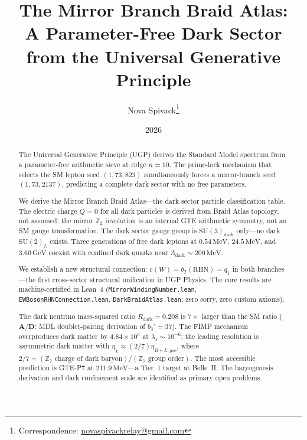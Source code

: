 \documentclass[11pt]{article}
\title{\bfseries The Mirror Branch Braid Atlas:\\[0.3em]
A Parameter-Free Dark Sector\\[0.3em]
from the Universal Generative Principle}
\author[1]{Nova Spivack\thanks{Correspondence:
  \href{mailto:novaspivackrelay@gmail.com}{novaspivackrelay@gmail.com}}}
\affil[1]{Independent Research}
\date{2026}
\newcommand{\CatAD}{\textbf{A/D}}
\begin{document}
\maketitle
\NovaZenodoAfterTitle

\begin{abstract}
The Universal Generative Principle (UGP) derives the Standard Model spectrum from a
parameter-free arithmetic sieve at ridge $n=10$. The prime-lock mechanism that selects
the SM lepton seed $(1,73,823)$ simultaneously forces a mirror-branch seed $(1,73,2137)$,
predicting a complete dark sector with no free parameters.

We derive the Mirror Branch Braid Atlas---the dark sector particle classification table.
The electric charge $Q=0$ for all dark particles is derived from Braid Atlas topology,
not assumed: the mirror $\mathbb{Z}_2$ involution is an internal GTE arithmetic symmetry,
not an SM gauge transformation. The dark sector gauge group is $\mathrm{SU}(3)_\mathrm{dark}$
only---no dark $\mathrm{SU}(2)_L$ exists. Three generations of free dark leptons at
$0.54\,\mathrm{MeV}$, $24.5\,\mathrm{MeV}$, and $3.60\,\mathrm{GeV}$ coexist with
confined dark quarks near $\Lambda_\mathrm{dark}\sim 200\,\mathrm{MeV}$.

We establish a new structural connection: $c(W) = b_2(\mathrm{RHN}) = q_1$ in both
branches---the first cross-sector structural unification in UGP Physics. The core results
are machine-certified in Lean~4 (\texttt{MirrorWindingNumber.lean},
\texttt{EWBosonRHNConnection.lean}, \texttt{DarkBraidAtlas.lean}; zero sorry, zero
custom axioms).

The dark neutrino mass-squared ratio $R_\mathrm{dark} = 0.208$ is $7\times$ larger than
the SM ratio ($\CatAD$: MDL doublet-pairing derivation of $b_3'=37$). The FIMP mechanism overproduces
dark matter by $4.84\times10^6$ at $\lambda_s \sim 10^{-6}$; the leading resolution is
asymmetric dark matter with $\eta_\chi \approx (2/7)\eta_{B+L,\mathrm{pre}}$, where
$2/7 = (\mathbb{Z}_7\text{ charge of dark baryon})/(\mathbb{Z}_7\text{ group order})$.
The most accessible prediction is GTE-P7 at $211.9\,\mathrm{MeV}$---a Tier~1 target at
Belle~II. The baryogenesis derivation and dark confinement scale are identified as primary
open problems.
\end{abstract}

\tableofcontents
\end{document}
